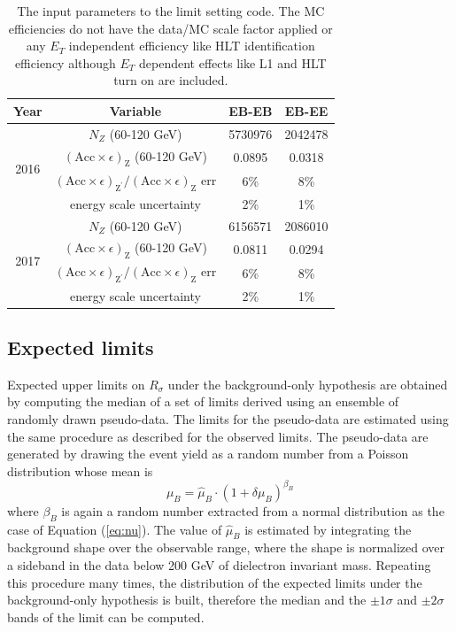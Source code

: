 \begin{table} [t]
\begin{center}
\begin{tabular}{|c|c|c|c|} \hline
Year                 &Variable                                 & EB-EB   & EB-EE \\\hline
\multirow{4}{*}{2016}&$N_{Z}$ (60-120 GeV)                     & 5730976 & 2042478 \\
                     &$(\mathrm{Acc}\times\epsilon)_{\mathrm{Z}}$ (60-120 GeV)            & 0.0895  & 0.0318 \\
                     &$(\mathrm{Acc}\times\epsilon)_{\mathrm{Z}^{'}}/(\mathrm{Acc}\times\epsilon)_{\mathrm{Z}}$ err & 6\%     & 8\%\\
                     &energy scale uncertainty                 &  2\%    & 1\% \\ \hline
\multirow{4}{*}{2017}&$N_{Z}$ (60-120 GeV)                     & 6156571 & 2086010 \\
                     &$(\mathrm{Acc}\times\epsilon)_{\mathrm{Z}}$ (60-120 GeV)            & 0.0811  & 0.0294 \\
                     &$(\mathrm{Acc}\times\epsilon)_{\mathrm{Z}^{'}}/(\mathrm{Acc}\times\epsilon)_{\mathrm{Z}}$ err & 6\%     & 8\%\\
                     &energy scale uncertainty                 &  2\%    & 1\% \\ \hline
\end{tabular}
\caption{The input parameters to the limit setting code. The MC efficiencies do not have the data/MC scale factor applied or any $E_{T}$ independent efficiency like HLT identification efficiency although $E_T$ dependent effects like L1 and HLT turn on are included.}
\label{tab:limitInput}
\end{center}
\end{table}

\subsection*{Expected limits}
Expected upper limits on $R_\sigma$ under the background-only hypothesis are obtained by computing the median of a set of limits derived using an ensemble
of randomly drawn pseudo-data. The limits for the pseudo-data are
estimated using the same procedure as described for the observed limits. The pseudo-data are generated by drawing the event yield as a random number from a Poisson distribution whose mean is
\begin{equation}
\label{eq:exp_mu}
\mu_{B} = \hat{\mu}_{B} \cdot (1 + \delta\mu_{B})^{\beta_{B}}
\end{equation}
where $\beta_{B}$ is again a random number extracted from a normal distribution as the case of Equation (\ref{eq:nu}). The value of $\hat{\mu}_{B}$ is estimated by integrating
the background shape over the observable range, where the shape is normalized over a sideband in the data below 200 GeV of dielectron invariant mass.
Repeating this procedure many times, the distribution of the expected limits under the background-only hypothesis is built, therefore the median and the $\pm1\sigma$ and $\pm2\sigma$ bands of the limit can be computed.


